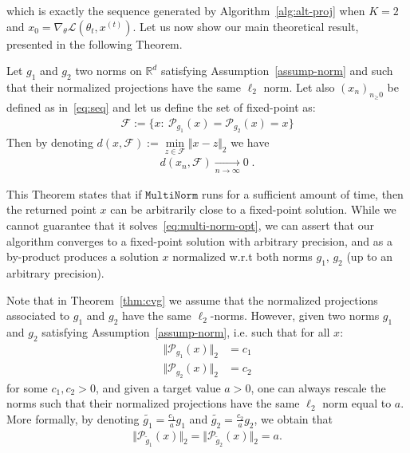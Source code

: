 which is exactly the sequence generated by Algorithm~\ref{alg:alt-proj} when $K=2$ and $x_0=\nabla_\theta\mathcal{L}(\theta_t,x^{(t)})$. Let us now show our main theoretical result, presented in the following Theorem.
\begin{theorem}
\label{thm:cvg}
Let $g_1$ and $g_2$ two norms on $\mathbb{R}^d$ satisfying Assumption~\ref{assump-norm} and such that their normalized projections have the same $\ell_2$ norm. Let also $(x_n)_{n_\geq 0}$ be defined as in~\eqref{eq:seq} and let us define the set of fixed-point as:
\begin{align*}
    \mathcal{F}:=\{x:~\mathcal{P}_{g_1}(x)=\mathcal{P}_{g_2}(x)=x\}
\end{align*}
Then by denoting $d(x,\mathcal{F}):=\min\limits_{z\in\mathcal{F}}\Vert x - z\Vert_2$ we have 
\begin{align*}
d(x_n,\mathcal{F}) \xrightarrow[n\to\infty]{} 0\; .
\end{align*}
\end{theorem}

This Theorem states that if $\texttt{MultiNorm}$ runs for a sufficient amount of time, then the returned point $x$ can be arbitrarily close to a fixed-point solution. While we cannot guarantee that it solves~\eqref{eq:multi-norm-opt}, we can assert that our algorithm converges to a fixed-point solution with arbitrary precision, and as a by-product produces a solution $x$ normalized w.r.t both norms $g_1$, $g_2$ (up to an arbitrary precision).

\begin{remark}
Note that in Theorem~\ref{thm:cvg} we assume that the normalized projections associated to $g_1$ and $g_2$ have the same $\ell_2$-norms. However, given two norms $g_1$ and $g_2$ satisfying Assumption~\ref{assump-norm}, i.e. such that for all $x$:
\begin{align*}
    \Vert \mathcal{P}_{g_1}(x) \Vert_2 &= c_1\\
    \Vert \mathcal{P}_{g_2}(x) \Vert_2 &= c_2
\end{align*}
for some $c_1,c_2>0$, and given a target value $a>0$, one can always rescale the norms such that their normalized projections have the same $\ell_2$ norm equal to $a$. More formally, by denoting $\tilde{g_1} = \frac{c_1}{a} g_1$ and $\tilde{g_2} = \frac{c_2}{a} g_2$, we obtain that
\begin{align*}
    \Vert \mathcal{P}_{\tilde{g}_1}(x)\Vert_2 =  \Vert \mathcal{P}_{\tilde{g}_2}(x)\Vert_2 = a .
\end{align*}
\end{remark}




